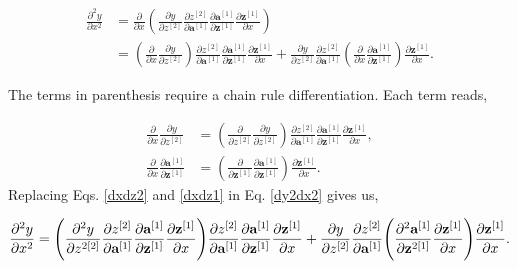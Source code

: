 \documentclass{article}
\begin{document}
\begin{align}
\frac{\partial^2 y}{\partial x^2}
&=\frac{\partial}{\partial x}\left( \frac{\partial y}{\partial z^{[2]}} \frac{\partial z^{[2]}}{\partial \textbf{a}^{[1]}} \frac{\partial \textbf{a}^{[1]}}{\partial \textbf{z}^{[1]}}  \frac{\partial \textbf{z}^{[1]}}{\partial x}\right) \\
&= \left( \frac{\partial}{\partial x}\frac{\partial y}{\partial z^{[2]}}\right) \frac{\partial z^{[2]}}{\partial \textbf{a}^{[1]}} \frac{\partial \textbf{a}^{[1]}}{\partial \textbf{z}^{[1]}}  \frac{\partial \textbf{z}^{[1]}}{\partial x} + 
\frac{\partial y}{\partial z^{[2]}} \frac{\partial z^{[2]}}{\partial \textbf{a}^{[1]}}  \left(\frac{\partial}{\partial x} \frac{\partial \textbf{a}^{[1]}}{\partial \textbf{z}^{[1]}}\right)  \frac{\partial \textbf{z}^{[1]}}{\partial x}.  
\label{dy2dx2} 
\end{align}

The terms in parenthesis require a chain rule differentiation. Each term reads,

\begin{align}
\label{dxdz2}
\frac{\partial}{\partial x} \frac{\partial y}{\partial z^{[2]}} &= 
\left(\frac{\partial}{\partial z^{[2]}} \frac{\partial y}{\partial z^{[2]}}\right) \frac{\partial z^{[2]}}{\partial \textbf{a}^{[1]}} \frac{\partial \textbf{a}^{[1]}}{\partial \textbf{z}^{[1]}} \frac{\partial \textbf{z}^{[1]}}{\partial x}, \\
\label{dxdz1}
\frac{\partial}{\partial x} \frac{\partial \textbf{a}^{[1]}}{\partial \textbf{z}^{[1]}} &=  \left(\frac{\partial}{\partial \textbf{z}^{[1]}} \frac{\partial \textbf{a}^{[1]}}{\partial \textbf{z}^{[1]}}\right)  \frac{\partial \textbf{z}^{[1]}}{\partial x}.
\end{align}
Replacing Eqs. \eqref{dxdz2} and \eqref{dxdz1} in Eq. \eqref{dy2dx2} gives us,

\begin{align}
\label{dy2dxlong} 
\frac{\partial^2 y}{\partial x^2} = 
\Bigg{(} \frac{\partial^2 y}{\partial z^{2[2]}} \frac{\partial z^{[2]}}{\partial \textbf{a}^{[1]}} \frac{\partial \textbf{a}^{[1]}}{\partial \textbf{z}^{[1]}} \frac{\partial \textbf{z}^{[1]}}{\partial x} \Bigg{)} 
\frac{\partial z^{[2]}}{\partial \textbf{a}^{[1]}} \frac{\partial \textbf{a}^{[1]}}{\partial \textbf{z}^{[1]}}  \frac{\partial \textbf{z}^{[1]}}{\partial x} + 
\frac{\partial y}{\partial z^{[2]}} \frac{\partial z^{[2]}}{\partial \textbf{a}^{[1]}} \Bigg{(} \frac{\partial^2 \textbf{a}^{[1]}}{\partial \textbf{z}^{2{[1]}}}  \frac{\partial \textbf{z}^{[1]}}{\partial x} \Bigg{)}  \frac{\partial \textbf{z}^{[1]}}{\partial x}. 
\end{align}
\end{document}
